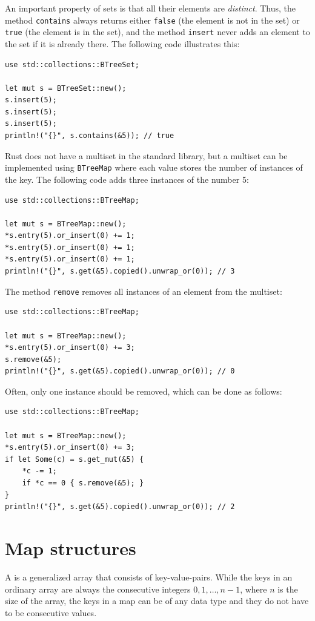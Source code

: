 An important property of sets is
that all their elements are \emph{distinct}.
Thus, the method \texttt{contains} always returns
either \texttt{false} (the element is not in the set)
or \texttt{true} (the element is in the set),
and the method \texttt{insert} never adds
an element to the set if it is
already there.
The following code illustrates this:

\begin{lstlisting}
use std::collections::BTreeSet;

let mut s = BTreeSet::new();
s.insert(5);
s.insert(5);
s.insert(5);
println!("{}", s.contains(&5)); // true
\end{lstlisting}

Rust does not have a multiset in the standard library,
but a multiset can be implemented using
\texttt{BTreeMap} where each value stores
the number of instances of the key.
The following code adds three instances
of the number 5:

\begin{lstlisting}
use std::collections::BTreeMap;

let mut s = BTreeMap::new();
*s.entry(5).or_insert(0) += 1;
*s.entry(5).or_insert(0) += 1;
*s.entry(5).or_insert(0) += 1;
println!("{}", s.get(&5).copied().unwrap_or(0)); // 3
\end{lstlisting}
The method \texttt{remove} removes
all instances of an element
from the multiset:
\begin{lstlisting}
use std::collections::BTreeMap;

let mut s = BTreeMap::new();
*s.entry(5).or_insert(0) += 3;
s.remove(&5);
println!("{}", s.get(&5).copied().unwrap_or(0)); // 0
\end{lstlisting}
Often, only one instance should be removed,
which can be done as follows:
\begin{lstlisting}
use std::collections::BTreeMap;

let mut s = BTreeMap::new();
*s.entry(5).or_insert(0) += 3;
if let Some(c) = s.get_mut(&5) {
    *c -= 1;
    if *c == 0 { s.remove(&5); }
}
println!("{}", s.get(&5).copied().unwrap_or(0)); // 2
\end{lstlisting}

\section{Map structures}


A  is a generalized array
that consists of key-value-pairs.
While the keys in an ordinary array are always
the consecutive integers $0,1,\ldots,n-1$,
where $n$ is the size of the array,
the keys in a map can be of any data type and
they do not have to be consecutive values.

